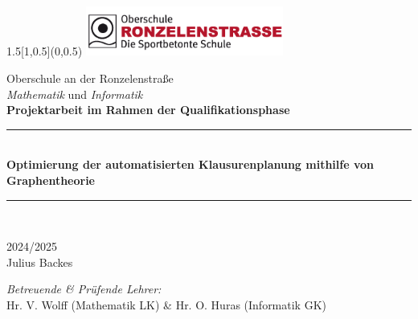 \begin{titlepage}
\BgThispage
\begin{textblock}{1.5}[1,0.5](0,0.5)
	\includegraphics[width=6.5cm]{logos/logoronzelen.png}\\[3.5cm]
  \end{textblock}
  

  
\bigskip
\bigskip
\begin{center}
{ \large{Oberschule an der Ronzelenstraße\\[0.2cm]
\textit{Mathematik} und \textit{Informatik}}}\\[1cm]

{\large \textbf{Projektarbeit im Rahmen der Qualifikationsphase}}\\[0.6cm]

\rule{\linewidth}{0.5mm} \\[0.1cm]
{ \huge \bfseries Optimierung der automatisierten Klausurenplanung mithilfe von Graphentheorie
 \\[0.1cm] }
\rule{\linewidth}{0.5mm} \\[1.5cm]

\noindent

{\large  
    2024/2025
  } \\[1cm] 

{\Large  
    Julius Backes
  } \\

\begin{center}
    
\end{center}

{\textit{Betreuende \& Prüfende Lehrer:}}\\[0.3cm]
 {Hr. V. Wolff (Mathematik LK) \& Hr. O. Huras (Informatik GK)}




\end{center}


\end{titlepage}